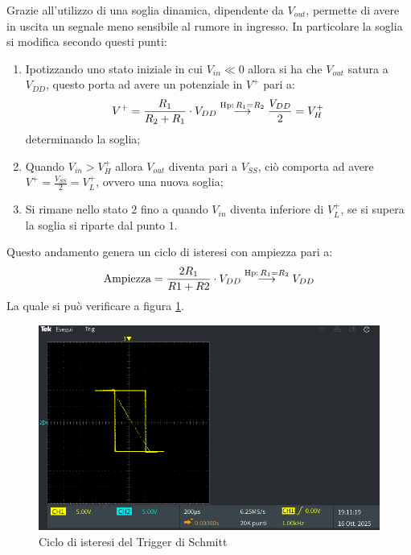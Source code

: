 \documentclass[a4paper,12pt]{article}
\begin{document}
Grazie all'utilizzo di una soglia dinamica, dipendente da $V_{out}$, permette di avere in uscita un segnale meno sensibile al rumore in ingresso. In particolare la soglia si modifica secondo questi punti:
\begin{enumerate}
	\item Ipotizzando uno stato iniziale in cui $V_{in} \ll 0$ allora si ha che $V_{out}$ satura a $V_{DD}$, questo porta ad avere un potenziale in $V^+$ pari a:
	      \begin{align*}
		      V^+ = \frac{R_1}{R_2 + R_1} \cdot V_{DD} \overset{\tiny\mathrm{Hp:}\,R_1 = R_2}{\longrightarrow} \frac{V_{DD}}{2} = V^+_H
	      \end{align*}
	      determinando la soglia;
	\item Quando $V_{in} > V^+_H$ allora $V_{out}$ diventa pari a $V_{SS}$, ciò comporta ad avere $V^+ = \frac{V_{SS}}{2} = V^+_L$, ovvero una nuova soglia;
	\item Si rimane nello stato $2$ fino a quando $V_{in}$ diventa inferiore di $V^+_L$, se si supera la soglia si riparte dal punto $1$.
\end{enumerate}
Questo andamento genera un ciclo di isteresi con ampiezza pari a:
\begin{align*}
	\mathrm{Ampiezza}=\frac{2R_1}{R1+R2} \cdot V_{DD} \overset{\tiny\mathrm{Hp:}\,R_1 = R_2}{\longrightarrow} V_{DD}
\end{align*}
La quale si può verificare a figura \ref{fig:schmitt_mod_xy}.

\begin{figure}[h]
	\centering
	\includegraphics[width = 0.7\linewidth]{immagini/schmitt/schmitt_vin_vout_xy.png}
	\caption{Ciclo di isteresi del Trigger di Schmitt}
	\label{fig:schmitt_mod_xy}
\end{figure}
\end{document}
